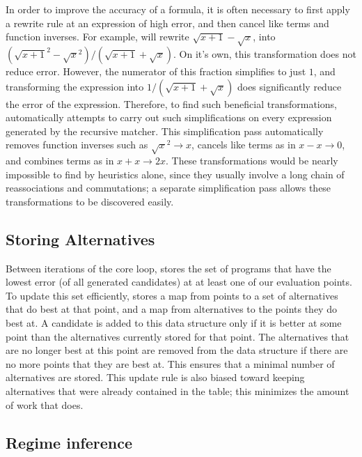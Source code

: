 \documentclass[paper.tex]{subfiles}
\begin{document}
In order to improve the accuracy of a formula,
  it is often necessary to first apply a rewrite rule
  at an expression of high error,
  and then cancel like terms and function inverses.
For example, \casio will rewrite $\sqrt{x+1} - \sqrt{x}$,
  into $(\sqrt{x+1}^2 - \sqrt{x}^2) / (\sqrt{x+1} + \sqrt{x})$.
On it's own, this transformation does not reduce error.
However, the numerator of this fraction simplifies to just $1$,
  and transforming the expression into $1/(\sqrt{x+1} + \sqrt{x})$
  does significantly reduce the error of the expression.
Therefore, to find such beneficial transformations,
  \casio automatically attempts to carry out such simplifications
  on every expression generated by the recursive matcher.
This simplification pass automatically
  removes function inverses such as $\sqrt{x}^2 \to x$,
  cancels like terms as in $x - x \to 0$,
  and combines terms as in $x + x \to 2x$.
These transformations would be nearly impossible to find
  by heuristics alone, 
  since they usually involve a long chain of reassociations and commutations;
  a separate simplification pass allows these transformations
  to be discovered easily.

\subsection{Storing Alternatives}

Between iterations of the core loop,
  \casio stores the set of programs
  that have the lowest error (of all generated candidates)
  at at least one of our evaluation points.
To update this set efficiently, \casio stores
  a map from points to a set of alternatives that do best at that point,
  and a map from alternatives to the points they do best at.
A candidate is added to this data structure
  only if it is better at some point
  than the alternatives currently stored for that point.
The alternatives that are no longer best at this point
  are removed from the data structure
  if there are no more points that they are best at.
This ensures that a minimal number of alternatives are stored.
This update rule is also biased toward keeping alternatives
  that were already contained in the table;
  this minimizes the amount of work that \casio does.

\subsection{Regime inference}
\end{document}
